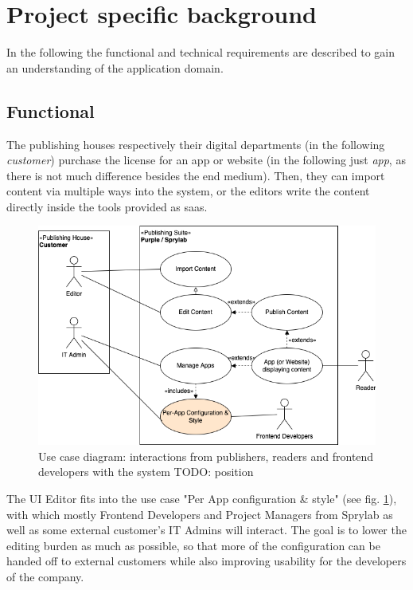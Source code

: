 \section{Project specific background}

In the following the functional and technical requirements are described to gain an understanding of the application domain.

\subsection{Functional}

The publishing houses respectively their digital departments (in the following \textit{customer}) purchase the license for an app or website (in the following just \textit{app}, as there is not much difference besides the end medium).
Then, they can import content via multiple ways into the system, or the editors write the content directly inside the tools provided as \Gls{saas}.

\begin{figure}[h!]
  \includegraphics[width=\textwidth]{pics/purple-abstract.drawio.png}
  \caption{Use case diagram: interactions from publishers, readers and frontend developers with the system TODO: position}
  \label{fig:usecase1}
\end{figure}

The UI Editor fits into the use case "Per App configuration \& style" (see fig. \ref*{fig:usecase1}), with which mostly Frontend Developers and Project Managers from Sprylab as well as some external customer's IT Admins will interact. The goal is to lower the editing burden as much as possible, so that more of the configuration can be handed off to external customers while also improving usability for the developers of the company.

